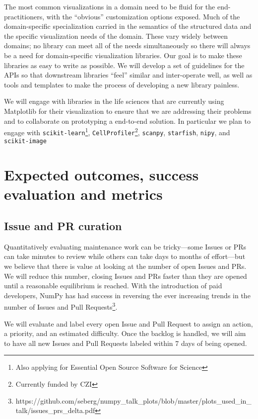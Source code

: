\documentclass[11pt,letterpaper]{article}  %
\begin{document}
The most common visualizations in a domain need to be fluid
for the end-practitioners, with the ``obvious''
customization options exposed.
Much of the domain-specific
specialization carried in the semantics of the structured data and the
specific visualization needs of the domain.  These vary widely between domains;
no library can meet all of the needs simultaneously so there will always
be a need for domain-specific visualization libraries.
Our goal is to make these libraries as easy to write as possible.
We will develop a set of guidelines for the APIs so that downstream
libraries ``feel'' similar and inter-operate well, as well as tools and
templates to make the process of developing a new library painless.

We will engage with libraries in the life sciences that are currently
using Matplotlib for their visualization to ensure that we are
addressing their problems and to collaborate on prototyping a
end-to-end solution.
In particular we plan to engage with
\texttt{scikit-learn}\footnote{Also applying for Essential Open Source
Software for Science}, \texttt{CellProfiler}\footnote{Currently funded
by CZI\label{f:czi}}, \texttt{scanpy},
\texttt{starfish}, \texttt{nipy}, and
\texttt{scikit-image}




\section{Expected outcomes, success evaluation and metrics}
\subsection{Issue and PR curation}

Quantitatively evaluating maintenance work can be tricky---some Issues
or PRs can take minutes to review while  others can take days to
months of effort---but we believe that there is value at looking at
the number of open Issues and PRs.  We will reduce this
number, closing Issues and PRs faster than they are
opened until a reasonable equilibrium is reached.
With the introduction of paid developers,
NumPy has had success in reversing the ever increasing trends
in the number of Issues and Pull Requests\footnote{https://github.com/seberg/numpy\_talk\_plots/blob/master/plots\_used\_in\_talk/issues\_prs\_delta.pdf}.


We will evaluate and label every open Issue and Pull Request to
assign an action, a priority, and an estimated
difficulty.  Once the backlog is handled, we will aim to have all new Issues and
Pull Requests labeled within 7 days of being opened.
\end{document}
